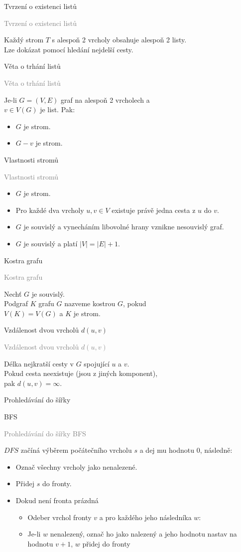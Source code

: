 \documentclass[20pt]{extarticle}
\newcommand{\card}[3][]{
	\vspace*{\fill}

	\newpage
	\topskip0pt
	\vspace*{\fill}
		\Large #2

		\vspace{1cm}
		\normalsize #1
	\vspace*{\fill}
	\newpage

	\small \textcolor{gray}{#2 #1}
	\topskip0pt
	\vspace*{\fill}

	\normalsize
	#3
	\vspace*{\fill}
}
\newcommand{\pair}[2]{\left(#1, #2\right)}
\newcommand{\graph}{G=\pair{V}{E}}
\newcommand{\vertexes}[1][G]{V(#1)}
\begin{document}
\begin{center}
\card{Tvrzení o existenci listů}{
	Každý strom $T$ s alespoň 2 vrcholy obsahuje alespoň 2 listy.\\
	Lze dokázat pomocí hledání nejdelší cesty.
}

\card{Věta o trhání listů}{
	Je-li $\graph$ graf na alespoň 2 vrcholech a\\
	$v \in \vertexes$ je list. Pak:
	\begin{itemize}
		\item $G$ je strom.
		\item $G - v$ je strom.
	\end{itemize}
}

\card{Vlastnosti stromů}{
	\begin{itemize}
		\item $G$ je strom.
		\item Pro každé dva vrcholy $u,v \in V$ existuje právě jedna cesta z $u$ do $v$.
		\item $G$ je souvislý a vynecháním libovolné hrany vznikne nesouvislý graf.
		\item $G$ je souvislý a platí $|V|=|E|+1$.
	\end{itemize}
}

\card{Kostra grafu}{
	Nechť $G$ je souvislý.\\
	Podgraf $K$ grafu $G$ nazveme kostrou $G$, pokud\\
	$\vertexes[K]=\vertexes[G]$ a $K$ je strom.
}

\card{Vzdálenost dvou vrcholů $d\pair{u}{v}$}{
	Délka nejkratší cesty v $G$ spojující $u$ a $v$.\\ Pokud cesta neexistuje (jsou z jiných komponent),\\
	pak $d\pair{u}{v}=\infty$.
}

\card[BFS]{Prohledávání do šířky}{
    \small
	$DFS$ začíná výběrem počátečního vrcholu $s$ a dej mu hodnotu 0, následně:
	\begin{itemize}
		\item Označ všechny vrcholy jako nenalezené.
		\item Přidej $s$ do fronty.
		\item Dokud není fronta prázdná
		\begin{itemize}
			\item Odeber vrchol fronty $v$ a pro každého jeho následníka $w$:
			\item Je-li $w$ nenalezený, označ ho jako nalezený a jeho hodnotu nastav na hodnotu $v + 1$, $w$ přidej do fronty
		\end{itemize}
	\end{itemize}
	\normalsize
}


\end{center}
\end{document}
